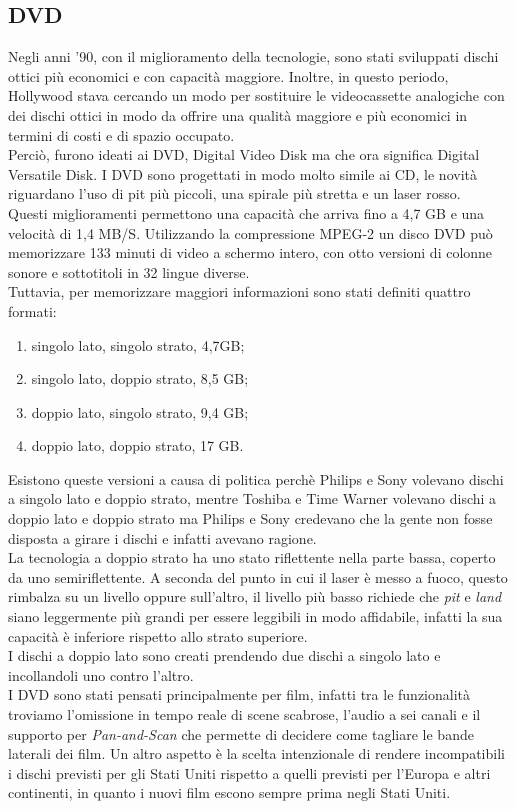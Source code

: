 \documentclass[12pt]{report}
\begin{document}
\subsection{DVD}
Negli anni '90, con il miglioramento della tecnologie, sono stati sviluppati dischi ottici più economici e con capacità maggiore. Inoltre, in questo periodo, Hollywood stava cercando un modo per sostituire le videocassette analogiche con dei dischi ottici in modo da offrire una qualità maggiore e più economici in termini di costi e di spazio occupato. \\
Perciò, furono ideati ai DVD, Digital Video Disk ma che ora significa Digital Versatile Disk. I DVD sono progettati in modo molto simile ai CD, le novità riguardano l'uso di pit più piccoli, una spirale più stretta e un laser rosso. \\
Questi miglioramenti permettono una capacità che arriva fino a 4,7 GB e una velocità di 1,4 MB/S. Utilizzando la compressione MPEG-2 un disco DVD può memorizzare 133 minuti di video a schermo intero, con otto versioni di colonne sonore e sottotitoli in 32 lingue diverse. \\
Tuttavia, per memorizzare maggiori informazioni sono stati definiti quattro formati:
\begin{enumerate}
	\item singolo lato, singolo strato, 4,7GB;
	\item singolo lato, doppio strato, 8,5 GB;
	\item doppio lato, singolo strato, 9,4 GB;
	\item doppio lato, doppio strato, 17 GB.
\end{enumerate}
Esistono queste versioni a causa di politica perchè Philips e Sony volevano dischi a singolo lato e doppio strato, mentre Toshiba e Time Warner volevano dischi a doppio lato e doppio strato ma Philips e Sony credevano che la gente non fosse disposta a girare i dischi e infatti avevano ragione. \\
La tecnologia a doppio strato ha uno stato riflettente nella parte bassa, coperto da uno semiriflettente. A seconda del punto in cui il laser è messo a fuoco, questo rimbalza su un livello oppure sull'altro, il livello più basso richiede che \textit{pit} e \textit{land} siano leggermente più grandi per essere leggibili in modo affidabile, infatti la sua capacità è inferiore rispetto allo strato superiore. \\
I dischi a doppio lato sono creati prendendo due dischi a singolo lato e incollandoli uno contro l'altro. \\
I DVD sono stati pensati principalmente per film, infatti tra le funzionalità troviamo l'omissione in tempo reale di scene scabrose, l'audio a sei canali e il supporto per \textit{Pan-and-Scan} che permette di decidere come tagliare le bande laterali dei film. Un altro aspetto è la scelta intenzionale di rendere incompatibili i dischi previsti per gli Stati Uniti rispetto a quelli previsti per l'Europa e altri continenti, in quanto i nuovi film escono sempre prima negli Stati Uniti.
\end{document}
